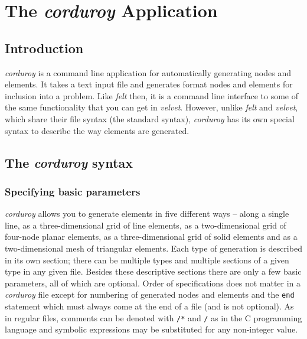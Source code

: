 
\newpage{\pagestyle{empty}\cleardoublepage}

\chapter{The {\em corduroy} Application}
\label{corduroy}

\section{Introduction}

{\em corduroy} is a command line application for automatically generating 
nodes and elements.  It takes
a text input file and generates \felt{} format nodes and elements for
inclusion into a \felt{} problem.  Like {\em felt} then, it is a command line
interface to some of the same functionality that you can get in
{\em velvet}.  However, unlike {\em felt} and {\em velvet}, which share their
file syntax (the standard \felt{} syntax), {\em corduroy} has its own
special syntax to describe the way elements are generated.

\section{The {\em corduroy} syntax}
\label{corduroy.syntax}
\subsection{Specifying basic parameters}

{\em corduroy} allows you to generate elements in five different ways --
along a single line, as a three-dimensional grid of line elements, as a
two-dimensional grid of four-node planar elements, as a three-dimensional
grid of solid elements and as a two-dimensional mesh of triangular elements.  
Each type of generation is described in its own section; there can be multiple 
types and multiple sections of a given type in any given file.  Besides these
descriptive sections there are only a few basic parameters, all of which
are optional.  Order of specifications does not matter in a {\em corduroy}
file except for numbering of generated nodes and elements and the 
{\tt end} statement which must always come at the end of a file (and is not 
optional).  As in regular \felt{} files, comments can be denoted with 
{\tt /*} and {\tt */} as in the C programming language and symbolic expressions
may be substituted for any non-integer value.


